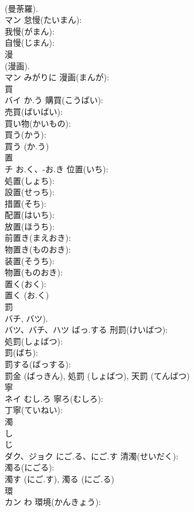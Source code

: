 \documentclass[8pt]{extreport}
\begin{document}
\begin{CJK}{UTF8}{min}
\\	(曼荼羅). 
\\	マン		怠慢(たいまん): 
\\	我慢(がまん): 
\\	自慢(じまん): 
\\	漫			
\\	(漫画). 
\\	マン	みがりに	漫画(まんが): 
\\	買			
\\	バイ	か.う	購買(こうばい): 
\\	売買(ばいばい): 
\\	買い物(かいもの): 
\\	買う(かう): 
\\	買う (か.う)
\\	置			
\\	チ	お.く、-お.き	位置(いち): 
\\	処置(しょち): 
\\	設置(せっち): 
\\	措置(そち): 
\\	配置(はいち): 
\\	放置(ほうち): 
\\	前置き(まえおき): 
\\	物置き(ものおき): 
\\	装置(そうち): 
\\	物置(ものおき): 
\\	置く(おく): 
\\	置く (お.く)
\\	罰			
\\	バチ, バツ).	
\\	バツ、バチ、ハツ	ばっ.する	刑罰(けいばつ): 
\\	処罰(しょばつ): 
\\	罰(ばち): 
\\	罰する(ばっする): 
\\	罰金 (ばっきん), 処罰 (しょばつ), 天罰 (てんばつ)
\\	寧			
\\	ネイ	むし.ろ	寧ろ(むしろ): 
\\	丁寧(ていねい): 
\\	濁			
\\	し 
\\	じ 
\\	ダク、ジョク	にご.る、にご.す	清濁(せいだく): 
\\	濁る(にごる): 
\\	濁す (にご.す), 濁る (にご.る)
\\	環			
\\	カン	わ	環境(かんきょう): 

\end{CJK}
\end{document}
